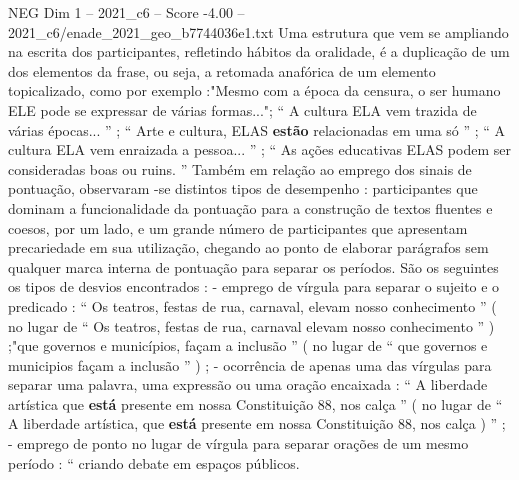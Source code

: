 \begin{textsample}{NEG Dim 1 – 2021\_c6 – Score -4.00 – 2021\_c6/enade\_2021\_geo\_b7744036e1.txt}
Uma estrutura que vem se ampliando na escrita dos participantes, refletindo hábitos da oralidade, é a duplicação de um dos elementos da frase, ou seja, a retomada anafórica de um elemento topicalizado, como por exemplo :"Mesmo com a época da censura, o ser humano ELE pode se expressar de várias formas..."; “ A cultura ELA vem trazida de várias épocas... ” ; “ Arte e cultura, ELAS \textbf{estão} relacionadas em uma só ” ; “ A cultura ELA vem enraizada a pessoa... ” ; “ As ações educativas ELAS podem ser consideradas boas ou ruins. ” Também em relação ao emprego dos sinais de pontuação, observaram -se distintos tipos de desempenho : participantes que dominam a funcionalidade da pontuação para a construção de textos fluentes e coesos, por um lado, e um grande número de participantes que apresentam precariedade em sua utilização, chegando ao ponto de elaborar parágrafos sem qualquer marca interna de pontuação para separar os períodos.
São os seguintes os tipos de desvios encontrados : - emprego de vírgula para separar o sujeito e o predicado : “ Os teatros, festas de rua, carnaval, elevam nosso conhecimento ” ( no lugar de “ Os teatros, festas de rua, carnaval elevam nosso conhecimento ” ) ;"que governos e municípios, façam a inclusão ” ( no lugar de “ que governos e municipios façam a inclusão ” ) ; - ocorrência de apenas uma das vírgulas para separar uma palavra, uma expressão ou uma oração encaixada : “ A liberdade artística que \textbf{está} presente em nossa Constituição 88, nos calça ” ( no lugar de “ A liberdade artística, que \textbf{está} presente em nossa Constituição 88, nos calça ) ” ; - emprego de ponto no lugar de vírgula para separar orações de um mesmo período : “ criando debate em espaços públicos.

\end{textsample}
